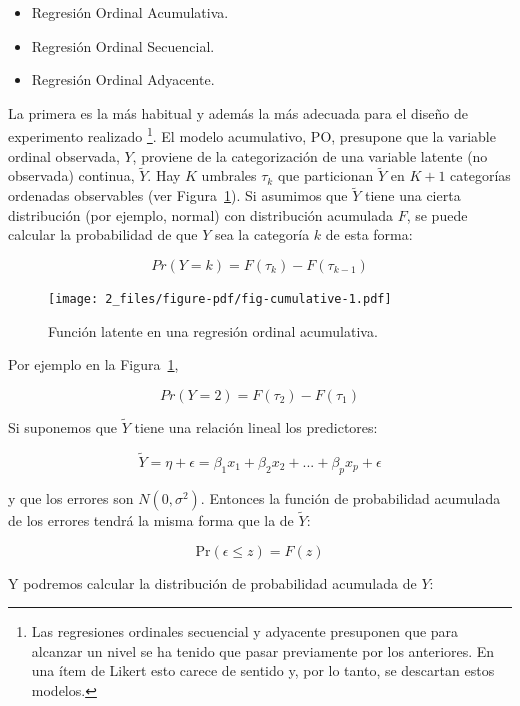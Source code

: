 \documentclass[
  12pt,
  a4paper,
  extrafontsizes,
  onecolumn,
  openright]{memoir}
\providecommand{\tightlist}{%
  \setlength{\itemsep}{0pt}\setlength{\parskip}{0pt}}\usepackage{longtable,booktabs,array}
\begin{document}
\begin{itemize}
\tightlist
\item
  Regresión Ordinal Acumulativa.
\item
  Regresión Ordinal Secuencial.
\item
  Regresión Ordinal Adyacente.
\end{itemize}

La primera es la más habitual y además la más adecuada para el diseño de
experimento realizado \autocite[ver][pp.~23-24]{burkner2019}
\footnote{Las regresiones ordinales secuencial y adyacente presuponen
  que para alcanzar un nivel se ha tenido que pasar previamente por los
  anteriores. En una ítem de Likert esto carece de sentido y, por lo
  tanto, se descartan estos modelos.}. El modelo acumulativo, PO,
presupone que la variable ordinal observada, \(Y\), proviene de la
categorización de una variable latente (no observada) continua,
\(\tilde{Y}\). Hay \(K\) umbrales \(\tau_k\) que particionan
\(\tilde{Y}\) en \(K + 1\) categorías ordenadas observables (ver
Figura~\ref{fig-cumulative}). Si asumimos que \(\tilde{Y}\) tiene una
cierta distribución (por ejemplo, normal) con distribución acumulada
\(F\), se puede calcular la probabilidad de que \(Y\) sea la categoría
\(k\) de esta forma:

\[Pr(Y = k) = F(\tau_k) - F(\tau_{k-1})\]

\begin{figure}[h]

{\centering \texttt{[image: 2\_files/figure-pdf/fig-cumulative-1.pdf]}

}

\caption{\label{fig-cumulative}Función latente en una regresión ordinal
acumulativa.}

\end{figure}

Por ejemplo en la Figura~\ref{fig-cumulative},

\[Pr(Y = 2) = F(\tau_2) - F(\tau_{1})\]

Si suponemos que \(\tilde{Y}\) tiene una relación lineal los
predictores:

\[\tilde{Y} = \eta + \epsilon = \beta_1 x_1 + \beta_2 x_2 + ... + \beta_p x_p + \epsilon\]

y que los errores son \(N(0,\sigma^2)\). Entonces la función de
probabilidad acumulada de los errores tendrá la misma forma que la de
\(\tilde{Y}\):

\[\mathrm{Pr}(\epsilon \leq z) = F(z)\]

Y podremos calcular la distribución de probabilidad acumulada de \(Y\):
\end{document}
